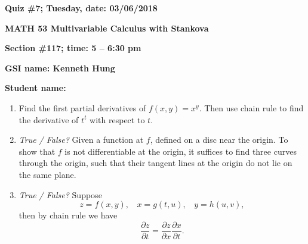 \documentclass{article}
\begin{document}
{\bf Quiz \#7; Tuesday, date: 03/06/2018}

{\bf MATH 53 Multivariable Calculus with Stankova}

{\bf Section \#117; time: 5 -- 6:30 pm}

{\bf GSI name: Kenneth Hung}

{\bf Student name:}

\vspace*{0.25in}

\begin{enumerate}
\item Find the first partial derivatives of $f(x, y) = x^y$. Then use chain rule to find the derivative of $t^t$ with respect to $t$.

\item {\em True / False?} Given a function at $f$, defined on a disc near the origin. To show that $f$ is not differentiable at the origin, it suffices to find three curves through the origin, such that their tangent lines at the origin do not lie on the same plane.

\item {\em True / False?} Suppose
\[
z = f(x, y), ~~~~ x = g(t, u), ~~~~ y = h(u, v),
\]
then by chain rule we have
\[
\frac{\partial z}{\partial t} = \frac{\partial z}{\partial x} \frac{\partial x}{\partial t}.
\]
\end{enumerate}
\end{document}
